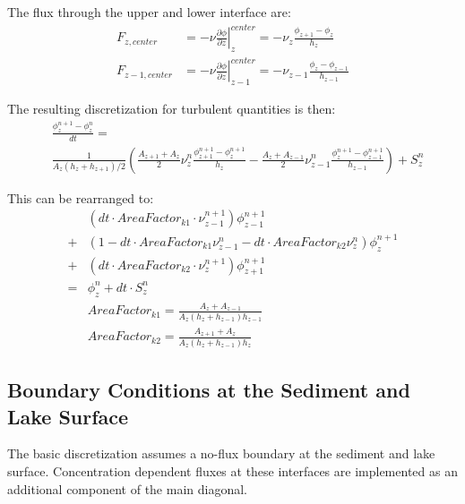 \documentclass[paper=a4, fontsize=12pt]{article}
\begin{document}
\noindent The flux through the upper and lower interface are:
\begin{align}
F_{z,center} &= -\nu\left.\frac{\partial \phi}{\partial z}\right|_{z}^{center} = -\nu_{z}\frac{\phi_{z+1}-\phi_{z}}{h_{z}} \\
F_{z-1,center} &= -\nu\left.\frac{\partial \phi}{\partial z}\right|_{z-1}^{center} = -\nu_{z-1}\frac{\phi_{z}-\phi_{z-1}}{h_{z-1}}
\end{align}

\noindent The resulting discretization for turbulent quantities is then:
\begin{align}
&\frac{\phi^{n+1}_z-\phi^n_z}{dt} = \nonumber\\
&\frac{1}{A_z\left(h_z+h_{z+1}\right)/2}
\left(\frac{A_{z+1}+A_z}{2}\nu^{n}_{z}\frac{\phi^{n+1}_{z+1}-\phi^{n+1}_{z}}{h_{z}}
-\frac{A_{z}+A_{z-1}}{2}\nu^{n}_{z-1}\frac{\phi^{n+1}_{z}-\phi^{n+1}_{z-1}}{h_{z-1}}
\right)+S^n_z 
\end{align}

\noindent This can be rearranged to:
\begin{align}
  &\left(dt\cdot AreaFactor_{k1}\cdot\nu^{n+1}_{z-1}\right)\phi^{n+1}_{z-1}\nonumber\\
  +&\left(1-dt\cdot AreaFactor_{k1}\nu^{n}_{z-1}-dt\cdot AreaFactor_{k2}\nu^{n}_{z}\right)\phi^{n+1}_z\nonumber\\
  +&\left(dt\cdot AreaFactor_{k2}\cdot\nu^{n+1}_{z}\right)\phi^{n+1}_{z+1}\nonumber\\ 
  =& \phi^{n}_{z}+dt\cdot S^n_z\\
&AreaFactor_{k1} = \frac{A_{z}+A_{z-1}}{A_z\left(h_z+h_{z-1}\right)h_{z-1}}\\
&AreaFactor_{k2} = \frac{A_{z+1}+A_z}{A_z\left(h_z+h_{z-1}\right)h_{z}}
\end{align}


\subsection{Boundary Conditions at the Sediment and Lake Surface}

The basic discretization assumes a no-flux boundary at the sediment and lake surface. Concentration dependent fluxes at these interfaces are implemented as an additional component of the main diagonal.

\end{document}
